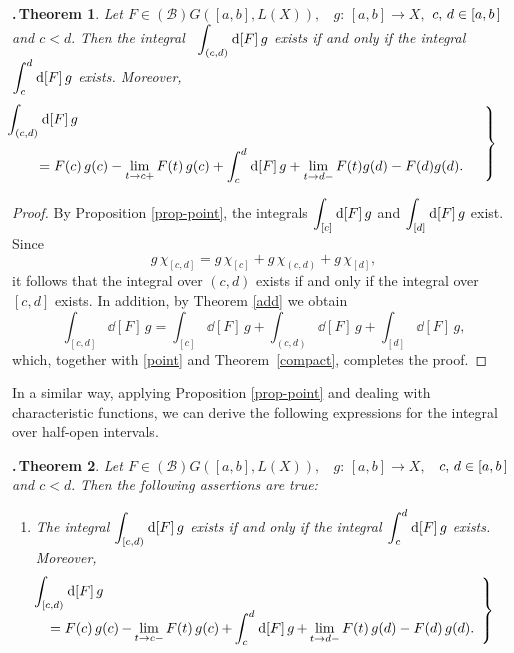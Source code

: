 \documentclass[12pt,twoside]{article}
\numberwithin{equation}{section}
\theoremstyle{plain}
\newtheorem{theorem}{\hskip-1mm.\,Theorem}[section]
\theoremstyle{definition}
\begin{document}
{\smallskip

\begin{theorem}\label{open}
Let $F\in(\mathcal{B})G([a,b],L(X)),$
\ $g{:}\,[a,b]\to X,$ $c,\,d\in[a,b\,]$ and $c<d.$
Then the integral \ $\displaystyle\int_{(c,d)}\hskip0.2mm\mbox{\rm d}[F]\,g$ exists if and only if the integral
$\displaystyle\int_{c}^{d}\hskip0.2mm\mbox{\rm d}[F]\,g$ exists. Moreover,
\begin{equation}\label{(c,d)}
\left.\begin{array}{l}\dis\hskip-8mm
  \int_{(c,d)}\dd[F]\,g
 \\[5mm]\dis
  =F(c)\,g(c)-\lim_{t\to c+}F(t)\,g(c)+\int_{c}^{d}\dd[F]\,g
   +\lim_{t\to d-}F(t)g(d)-F(d)g(d).
\end{array}\quad\right\}
\end{equation}
\end{theorem}
\begin{proof}
By Proposition \ref{prop-point}, the integrals $\displaystyle\int_{[c]}\hskip0.2mm\mbox{\rm d}[F]\,g$ and
$\displaystyle\int_{[d]}\hskip0.2mm\mbox{\rm d}[F]\,g$ exist. Since
\[
   g\,\chi_{[c,d]}=g\,\chi_{[c]}+g\,\chi_{(c,d)}+g\,\chi_{[d]},
\]
it follows that the integral over $(c,d)$ exists if and only if the integral over
$[c,d]$ exists. In addition, by Theorem \ref{add} we obtain
\[
    \int_{[c,d]}\dd[F]\,g
   =\int_{[c]}\dd[F]\,g+\int_{(c,d)}\dd[F]\,g+\int_{[d]}\dd[F]\,g,
\]
which, together with \eqref{point} and Theorem~\ref{compact}, completes the proof.
\end{proof}

\smallskip

In a similar way, applying Proposition \ref{prop-point} and dealing with
characteristic functions, we can derive the following expressions for the integral
over half-open intervals.

\smallskip

\begin{theorem}\label{half}
Let $F\in(\mathcal{B})G([a,b],L(X)),$ \ $g{:}\,[a,b]\to X,$ \ $c,\,d\in[a,b\,]$
and $c<d.$ Then the following assertions are true:
\begin{enumerate}[$(i)$]
\item The integral $\displaystyle\int_{[c,d)}\hskip0.2mm\mbox{\rm d}[F]\,g$ exists if and only if the integral
$\displaystyle\int_{c}^{d} \hskip0.2mm\mbox{\rm d}[F]\,g$ exists.
Moreover,
\begin{equation}\label{[c,d)}
\left.\begin{array}{l}\dis\hskip-8mm
     \int_{[c,d)} \dd[F]\,g
    \\\dis\hskip-4mm
     =F(c)\,g(c)\,{-}\lim_{t\to c-}F(t)\,g(c)\,{+}\int_{c}^{d}\dd[F]\,g
                                \,{+}\lim_{t\to d-}F(t)\,g(d)-F(d)\,g(d).
\end{array}\right\}
\end{equation}


\end{enumerate}
\end{theorem}}
\end{document}
